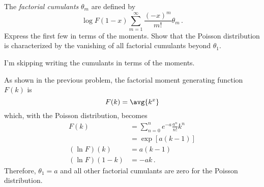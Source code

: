 

The \emph{factorial cumulants} $\theta_m$ are defined by
\begin{equation*}
  \log F(1 - x) \sum_{m=1}^\infty \frac{(-x)^m}{m!} \theta_m
  \, .
\end{equation*}
Express the first few in terms of the moments.
Show that the Poisson distribution is characterized by the vanishing of all factorial cumulants beyond $\theta_1$.


I'm skipping writing the cumulants in terms of the moments.

As shown in the previous problem, the factorial moment generating function $F(k)$ is
\begin{equation*}
  F(k) = \avg{k^x}
\end{equation*}
which, with the Poisson distribution, becomes
\begin{align*}
  F(k)
  &= \sum_{n=0}^n e^{-a} \frac{a^n}{n!} k^n \\
  &= \exp \left[ a(k-1) \right] \\
  (\ln F)(k)
  &= a (k - 1) \\
  (\ln F)(1 - k)
  &= -a k \, .
\end{align*}
Therefore, $\theta_1 = a$ and all other factorial cumulants are zero for the Poisson distribution.
